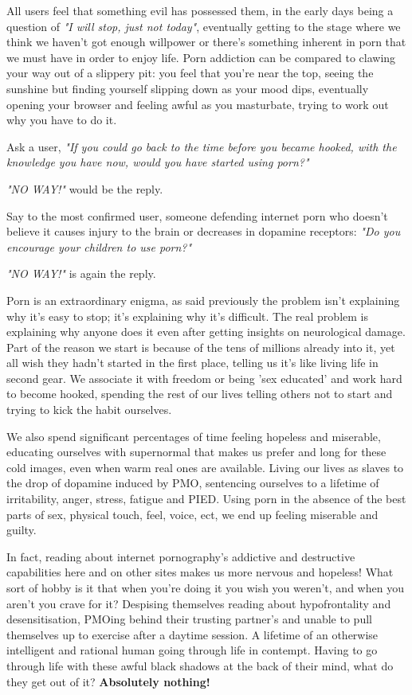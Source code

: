 \documentclass[easypeasy.tex]{subfiles}
\begin{document}
All users feel that something evil has possessed them, in the early days being a question of \textit{"I will stop, just not today"}, eventually getting to the stage where we think we haven't got enough willpower or there's something inherent in porn that we must have in order to enjoy life. Porn addiction can be compared to clawing your way out of a slippery pit: you feel that you're near the top, seeing the sunshine but finding yourself slipping down as your mood dips, eventually opening your browser and feeling awful as you masturbate, trying to work out why you have to do it.

Ask a user, \textit{"If you could go back to the time before you became hooked, with the knowledge you have now, would you have started using porn?"}

\textit{"NO WAY!"} would be the reply.

Say to the most confirmed user, someone defending internet porn who doesn't believe it causes injury to the brain or decreases in dopamine receptors: \textit{"Do you encourage your children to use porn?"}

\textit{"NO WAY!"} is again the reply.

Porn is an extraordinary enigma, as said previously the problem isn't explaining why it's easy to stop; it's explaining why it's difficult. The real problem is explaining why anyone does it even after getting insights on neurological damage. Part of the reason we start is because of the tens of millions already into it, yet all wish they hadn't started in the first place, telling us it's like living life in second gear. We associate it with freedom or being 'sex educated' and work hard to become hooked, spending the rest of our lives telling others not to start and trying to kick the habit ourselves.

We also spend significant percentages of time feeling hopeless and miserable, educating ourselves with supernormal that makes us prefer and long for these cold images, even when warm real ones are available. Living our lives as slaves to the drop of dopamine induced by PMO, sentencing ourselves to a lifetime of irritability, anger, stress, fatigue and PIED. Using porn in the absence of the best parts of sex, physical touch, feel, voice, ect, we end up feeling miserable and guilty.

In fact, reading about internet pornography's addictive and destructive capabilities here and on other sites makes us more nervous and hopeless! What sort of hobby is it that when you're doing it you wish you weren't, and when you aren't you crave for it? Despising themselves reading about hypofrontality and desensitisation, PMOing behind their trusting partner's and unable to pull themselves up to exercise after a daytime session. A lifetime of an otherwise intelligent and rational human going through life in contempt. Having to go through life with these awful black shadows at the back of their mind, what do they get out of it? \textbf{Absolutely nothing!}
\end{document}
